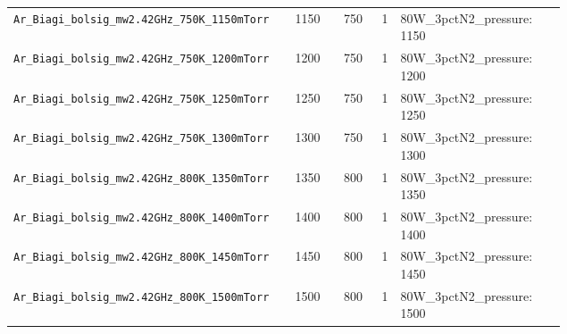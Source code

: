 \begin{longtable}{p{0.42\linewidth}rrrp{0.30\linewidth}}
\texttt{Ar\_Biagi\_bolsig\_mw2.42GHz\_750K\_1150mTorr} & 1150 & 750 & 1 & 80W\_3pctN2\_pressure: 1150 \\
\texttt{Ar\_Biagi\_bolsig\_mw2.42GHz\_750K\_1200mTorr} & 1200 & 750 & 1 & 80W\_3pctN2\_pressure: 1200 \\
\texttt{Ar\_Biagi\_bolsig\_mw2.42GHz\_750K\_1250mTorr} & 1250 & 750 & 1 & 80W\_3pctN2\_pressure: 1250 \\
\texttt{Ar\_Biagi\_bolsig\_mw2.42GHz\_750K\_1300mTorr} & 1300 & 750 & 1 & 80W\_3pctN2\_pressure: 1300 \\
\texttt{Ar\_Biagi\_bolsig\_mw2.42GHz\_800K\_1350mTorr} & 1350 & 800 & 1 & 80W\_3pctN2\_pressure: 1350 \\
\texttt{Ar\_Biagi\_bolsig\_mw2.42GHz\_800K\_1400mTorr} & 1400 & 800 & 1 & 80W\_3pctN2\_pressure: 1400 \\
\texttt{Ar\_Biagi\_bolsig\_mw2.42GHz\_800K\_1450mTorr} & 1450 & 800 & 1 & 80W\_3pctN2\_pressure: 1450 \\
\texttt{Ar\_Biagi\_bolsig\_mw2.42GHz\_800K\_1500mTorr} & 1500 & 800 & 1 & 80W\_3pctN2\_pressure: 1500 \\
\bottomrule
\end{longtable}
\endgroup
